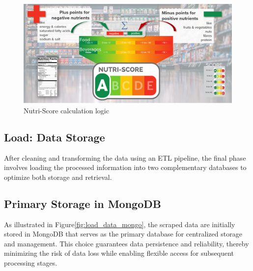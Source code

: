 

\begin{center}
\begin{figure}[H]
    \includegraphics[scale=0.35]{images/nutriscore.jpg}
    \caption{Nutri-Score calculation logic} 
    \label{fig: add_nutriscore}
\end{figure}
\end{center}

\subsection{Load: Data Storage}
After cleaning and transforming the data using an ETL pipeline, the final
phase involves loading the processed information into two complementary
databases to optimize both storage and retrieval.

\subsection{Primary Storage in MongoDB}
As illustrated in Figure\ref{fig:load_data_mongo}, the scraped data are initially stored in MongoDB that serves as the primary database for centralized storage and management. 
This choice guarantees data persistence and reliability, thereby minimizing the risk of data loss while enabling flexible access for subsequent processing stages.


